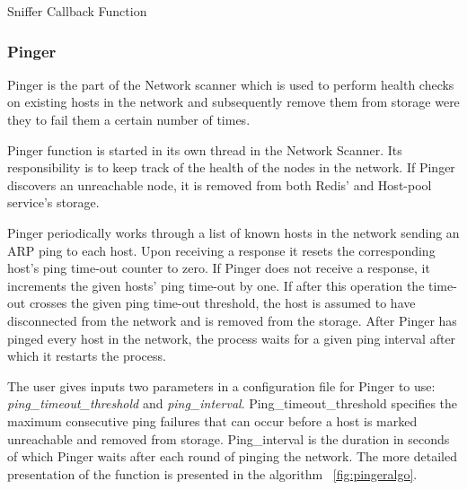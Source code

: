 \begin{center}
\begin{algorithm}[H]
\label{fig:snifferalgo}
\begin{center}
\end{center}
\caption{Sniffer Callback Function}
\end{algorithm}
\end{center}

\subsubsection{Pinger} \label{pinger}

Pinger is the part of the Network scanner which is used to perform health checks on existing hosts in the network and subsequently remove them from storage were they to fail them a certain number of times.

Pinger function is started in its own thread in the Network Scanner. Its responsibility is to keep track of the health of the nodes in the network. If Pinger discovers an unreachable node, it is removed from both Redis' and Host-pool service's storage.

Pinger periodically works through a list of known hosts in the network sending an ARP ping to each host. Upon receiving a response it resets the corresponding host's ping time-out counter to zero. If Pinger does not receive a response, it increments the given hosts' ping time-out by one. If after this operation the time-out crosses the given ping time-out threshold, the host is assumed to have disconnected from the network and is removed from the storage. After Pinger has pinged every host in the network, the process waits for a given ping interval after which it restarts the process.

The user gives inputs two parameters in a configuration file for Pinger to use: \textit{ping\_timeout\_threshold} and \textit{ping\_interval}. Ping\_timeout\_threshold specifies the maximum consecutive ping failures that can occur before a host is marked unreachable and removed from storage. Ping\_interval is the duration in seconds of which Pinger waits after each round of pinging the network. The more detailed presentation of the function is presented in the algorithm ~\ref{fig:pingeralgo}.

